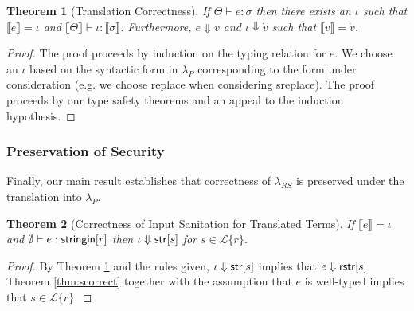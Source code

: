\documentclass[9pt]{sig-alternate}
\newtheorem{thm}{Theorem}
\theoremstyle{definition}
\renewcommand*{\proofname}{Proof Sketch}
\newcommand{\Lagr}{\mathcal{L}}
\newcommand{\lang}[1]{\Lagr\{#1\}}
\newcommand{\lambdas}{\lambda_{RS}}
\newcommand{\lambdap}{\lambda_P}
\newcommand{\sistr}[1]{{\sf rstr}[#1]}   \newcommand{\rstr}[1]{{\sf rstr}[#1]} %
\newcommand{\strin}[1]{\sistr{#1}}
\newcommand{\stringin}[1]{{\sf stringin}[#1]}
\renewcommand{\tstr}[1]{{{\sf str}[#1]}}
\newcommand{\tctx}{\Theta} %
\newcommand{\trden}[1]{\llbracket #1 \rrbracket} %
\newcommand{\treduces}{ \Downarrow }
\newcommand{\sreduces}{ \Downarrow }
\begin{document}
\begin{thm}[Translation Correctness]\label{thm:trcorrect}
  If $\tctx \vdash e : \sigma$ then 
  there exists an $\iota$ such that $\trden{e} = \iota$
  and $\trden{\tctx} \vdash \iota : \trden{\sigma}$.
  Furthermore, $e \sreduces v$ and
  $\iota \treduces \dot{v}$ such that
  $\trden{v} = \dot{v}$.
\end{thm}
\begin{proof}
The proof proceeds by induction on the typing relation for $e$. We choose an $\iota$ based on the syntactic form in $\lambdap$ corresponding to the form under consideration (e.g. we  choose {\sf replace} when considering {\sf sreplace}).
The proof proceeds by our type safety theorems and an appeal to the induction hypothesis.
\end{proof}

\subsubsection{Preservation of Security}

Finally, our main result establishes that correctness of $\lambdas$ is preserved under the translation into $\lambdap$. \renewcommand*{\proofname}{Proof}

\begin{thm}[Correctness of Input Sanitation for Translated Terms]\label{thm:main}
  If $\trden{e} = \iota$ and $\emptyset \vdash e : \stringin{r}$ then $\iota \sreduces \tstr{s}$
  for $s \in \lang{r}$.
\end{thm}
\begin{proof}
  By Theorem \ref{thm:trcorrect} and the rules given, $\iota \sreduces \tstr{s}$ implies that $e \sreduces \strin{s}$.
  Theorem \ref{thm:scorrect} together with the assumption that $e$ is well-typed implies that $s \in \lang{r}$.
\end{proof}

%
%
\end{document}
